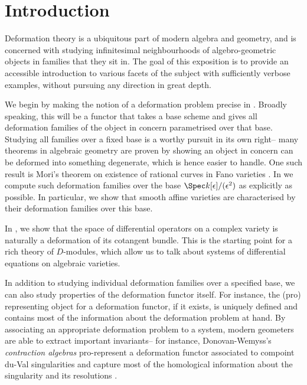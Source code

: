 \section{Introduction}
Deformation theory is a ubiquitous part of modern algebra and geometry, and is
concerned with studying infinitesimal neighbourhoods of algebro-geometric
objects in families that they sit in. The goal of this exposition is to provide
an accessible introduction to various facets of the subject with sufficiently
verbose examples, without pursuing any direction in great depth. 

We begin by making the notion of a deformation problem precise in
. Broadly speaking, this will be a functor
that takes a base scheme and gives all deformation families of the object in
concern parametrised over that base. Studying all families over a fixed 
base is a worthy pursuit in its own right-- many theorems in algebraic geometry
are proven by showing an object in concern can be deformed into something
degenerate, which is hence easier to handle. One such result is Mori's theorem
on existence of rational curves in Fano varieties
\cite[a treatment of this result can be found in ][Section
10.1]{matsukiIntroductionMoriProgram2002}. In 
we compute such deformation families over the base \(\Spec
k[\epsilon]/(\epsilon^2)\) as explicitly as possible. In particular, we show
that smooth affine varieties are characterised by their deformation families
over this base.

In , we show that the space of differential operators on a
complex variety is naturally a deformation of its cotangent bundle. This is the
starting point for a rich theory of \(D\)-modules, which allow us to talk about
systems of differential equations on algebraic varieties.

In addition to studying individual deformation families over a specified base, we
can also study properties of the deformation functor itself. For instance, the
(pro) representing object for a deformation functor, if it exists, is uniquely
defined and contains most of the information about the deformation problem at
hand. By associating an appropriate deformation problem to a system, modern
geometers are able to extract important invariants-- for instance,
Donovan-Wemyss's \emph{contraction algebras} pro-represent a deformation functor
associated to compoint du-Val singularities and capture most of the homological
information about the singularity and its resolutions
\cite[Section 5]{wemyssAspectsHomologicalMinimal}. 

